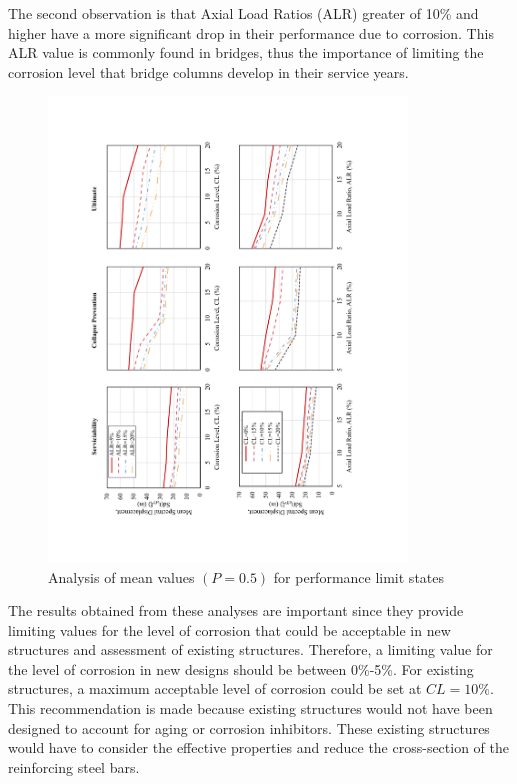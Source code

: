 The second observation is that Axial Load Ratios (ALR) greater of 10\% and higher have a more significant drop in their performance due to corrosion. This ALR value is commonly found in bridges, thus the importance of limiting the corrosion level that bridge columns develop in their service years.

\begin{figure}[htbp]
	\centering
	\includegraphics[width=0.85\textwidth]{VAC Thesis 2.0/Chapter-5/figs/Analysis_of_Mean_SDs.pdf}
	\caption{Analysis of mean values $(P=0.5)$ for performance limit states}
	\label{fig:mean_prob_vs_CL}
\end{figure}

The results obtained from these analyses are important since they provide limiting values for the level of corrosion that could be acceptable in new structures and assessment of existing structures. Therefore, a limiting value for the level of corrosion in new designs should be between 0\%-5\%. For existing structures, a maximum acceptable level of corrosion could be set at $CL=10\%$. This recommendation is made because existing structures would not have been designed to account for aging or corrosion inhibitors. These existing structures would have to consider the effective properties and reduce the cross-section of the reinforcing steel bars. 

